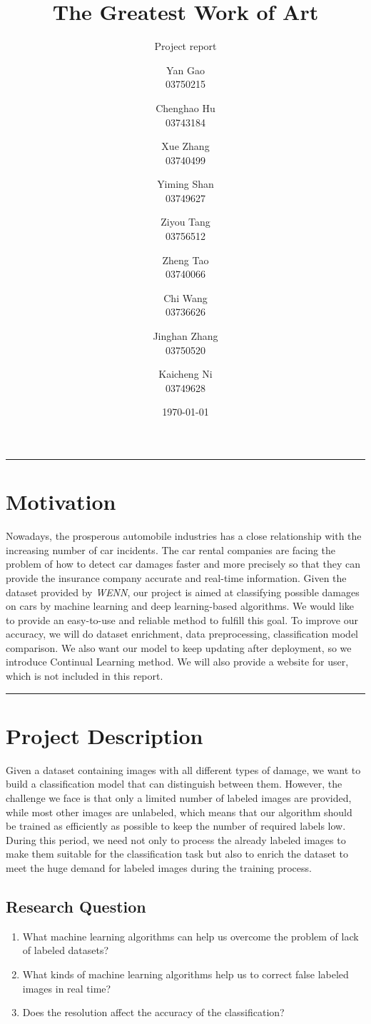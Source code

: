 \documentclass[lang=english,inputenc=utf8,fontsize=10pt]{ldvarticle}
\title{The Greatest Work of Art }
\subtitle{Project report}
\author{Yan Gao\\
03750215
\and
Chenghao Hu\\
03743184
\and
Xue Zhang\\
03740499
\and
Yiming Shan\\
03749627  
\and
Ziyou Tang\\
03756512
\and
Zheng Tao\\
03740066
\and
Chi Wang\\
03736626
\and
Jinghan Zhang\\
03750520
\and
Kaicheng Ni\\
03749628
}
\date{\today}
\begin{document}
\maketitle
\thispagestyle{empty}

\hrule

\section*{Motivation}
Nowadays, the prosperous automobile industries has a close relationship with the increasing number of car incidents. The car rental companies are facing the problem of how to detect car damages faster and more precisely so that they can provide the insurance company accurate and real-time information. Given the dataset provided by \textit{WENN}, our project is aimed at classifying possible damages on cars by machine learning and deep learning-based algorithms. We would like to provide an easy-to-use and reliable method to fulfill this goal. To improve our accuracy, we will do dataset enrichment, data preprocessing, classification model comparison. We also want our model to keep updating after deployment, so we introduce Continual Learning method. We will also provide a website for user, which is not included in this report.
\vspace*{1cm}
\hrule

\newpage
\tableofcontents

\newpage
\section{Project Description}

Given a dataset containing images with all different types of damage, we want to build a classification model that can distinguish between them. However, the challenge we face is that only a limited number of labeled images are provided, while most other images are unlabeled, which means that our algorithm should be trained as efficiently as possible to keep the number of required labels low. During this period, we need not only to process the already labeled images to make them suitable for the classification task but also to enrich the dataset to meet the huge demand for labeled images during the training process.

\subsection{Research Question}
\begin{enumerate}
\item What machine learning algorithms can help us overcome the problem of lack of labeled datasets?
\item What kinds of machine learning algorithms help us to correct false labeled images in real time?
\item Does the resolution affect the accuracy of the classification?
\end{enumerate}
\end{document}
